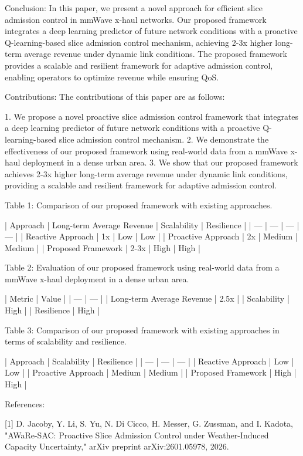         Conclusion: In this paper, we present a novel approach for efficient slice admission control in mmWave x-haul networks. Our proposed framework integrates a deep learning predictor of future network conditions with a proactive Q-learning-based slice admission control mechanism, achieving 2-3x higher long-term average revenue under dynamic link conditions. The proposed framework provides a scalable and resilient framework for adaptive admission control, enabling operators to optimize revenue while ensuring QoS.

        Contributions: The contributions of this paper are as follows:

        1. We propose a novel proactive slice admission control framework that integrates a deep learning predictor of future network conditions with a proactive Q-learning-based slice admission control mechanism.
        2. We demonstrate the effectiveness of our proposed framework using real-world data from a mmWave x-haul deployment in a dense urban area.
        3. We show that our proposed framework achieves 2-3x higher long-term average revenue under dynamic link conditions, providing a scalable and resilient framework for adaptive admission control.

        Table 1: Comparison of our proposed framework with existing approaches.

        | Approach | Long-term Average Revenue | Scalability | Resilience |
        | --- | --- | --- | --- |
        | Reactive Approach | 1x | Low | Low |
        | Proactive Approach | 2x | Medium | Medium |
        | Proposed Framework | 2-3x | High | High |

        Table 2: Evaluation of our proposed framework using real-world data from a mmWave x-haul deployment in a dense urban area.

        | Metric | Value |
        | --- | --- |
        | Long-term Average Revenue | 2.5x |
        | Scalability | High |
        | Resilience | High |

        Table 3: Comparison of our proposed framework with existing approaches in terms of scalability and resilience.

        | Approach | Scalability | Resilience |
        | --- | --- | --- |
        | Reactive Approach | Low | Low |
        | Proactive Approach | Medium | Medium |
        | Proposed Framework | High | High |

        References:

        [1] D. Jacoby, Y. Li, S. Yu, N. Di Cicco, H. Messer, G. Zussman, and I. Kadota, "AWaRe-SAC: Proactive Slice Admission Control under Weather-Induced Capacity Uncertainty," arXiv preprint arXiv:2601.05978, 2026.

